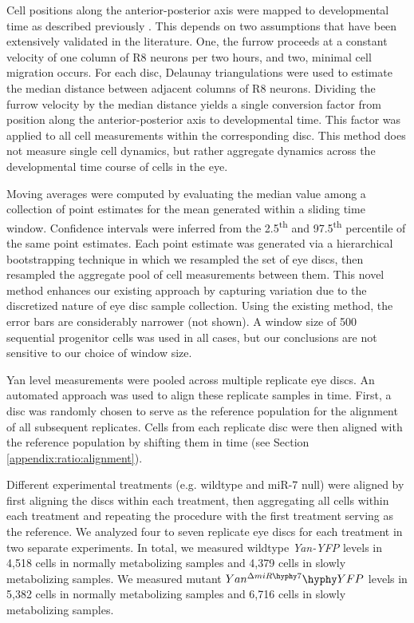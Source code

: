 Cell positions along the anterior-posterior axis were mapped to developmental time as described previously \cite{Pelaez2015a}. This depends on two assumptions that have been extensively validated in the literature. One, the furrow proceeds at a constant velocity of one column of R8 neurons per two hours, and two, minimal cell migration occurs. For each disc, Delaunay triangulations were used to estimate the median distance between adjacent columns of R8 neurons. Dividing the furrow velocity by the median distance yields a single conversion factor from position along the anterior-posterior axis to developmental time. This factor was applied to all cell measurements within the corresponding disc. This method does not measure single cell dynamics, but rather aggregate dynamics across the developmental time course of cells in the eye.

Moving averages were computed by evaluating the median value among a collection of point estimates for the mean generated within a sliding time window. Confidence intervals were inferred from the 2.5\textsuperscript{th} and 97.5\textsuperscript{th} percentile of the same point estimates. Each point estimate was generated via a hierarchical bootstrapping technique in which we resampled the set of eye discs, then resampled the aggregate pool of cell measurements between them. This novel method enhances our existing approach \cite{Pelaez2015a} by capturing variation due to the discretized nature of eye disc sample collection. Using the existing method, the error bars are considerably narrower (not shown). A window size of 500 sequential progenitor cells was used in all cases, but our conclusions are not sensitive to our choice of window size.

Yan level measurements were pooled across multiple replicate eye discs. An automated approach was used to align these replicate samples in time. First, a disc was randomly chosen to serve as the reference population for the alignment of all subsequent replicates. Cells from each replicate disc were then aligned with the reference population by shifting them in time (see Section \ref{appendix:ratio:alignment}).

Different experimental treatments (e.g. wildtype and miR-7 null) were aligned by first aligning the discs within each treatment, then aggregating all cells within each treatment and repeating the procedure with the first treatment serving as the reference. We analyzed four to seven replicate eye discs for each treatment in two separate experiments. In total, we measured wildtype \textit{Yan-YFP} levels in 4,518 cells in normally metabolizing samples and 4,379 cells in slowly metabolizing samples. We measured mutant $Yan^{\Delta miR\hyphy 7}\hyphy YFP$ levels in 5,382 cells in normally metabolizing samples and 6,716 cells in slowly metabolizing samples.
